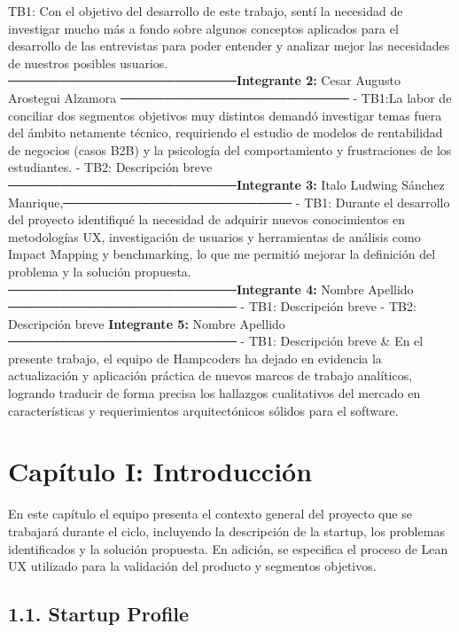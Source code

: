 {\begin{longtable}[]
TB1: Con el objetivo del desarrollo de este trabajo, sentí la necesidad
de investigar mucho más a fondo sobre algunos conceptos aplicados para
el desarrollo de las entrevistas para poder entender y analizar mejor
las necesidades de nuestros posibles usuarios.
──────────────────────────\textbf{Integrante 2:} Cesar Augusto Arostegui
Alzamora ────────────────────────── - TB1:La labor de conciliar dos
segmentos objetivos muy distintos demandó investigar temas fuera del
ámbito netamente técnico, requiriendo el estudio de modelos de
rentabilidad de negocios (casos B2B) y la psicología del comportamiento
y frustraciones de los estudiantes. - TB2: Descripción breve
──────────────────────────\textbf{Integrante 3:} Italo Ludwing Sánchez
Manrique,────────────────────────── - TB1: Durante el desarrollo del
proyecto identifiqué la necesidad de adquirir nuevos conocimientos en
metodologías UX, investigación de usuarios y herramientas de análisis
como Impact Mapping y benchmarking, lo que me permitió mejorar la
definición del problema y la solución propuesta.
──────────────────────────\textbf{Integrante 4:} Nombre Apellido
────────────────────────── - TB1: Descripción breve - TB2: Descripción
breve \textbf{Integrante 5:} Nombre Apellido ──────────────────────────
- TB1: Descripción breve & En el presente trabajo, el equipo de
Hampcoders ha dejado en evidencia la actualización y aplicación práctica
de nuevos marcos de trabajo analíticos, logrando traducir de forma
precisa los hallazgos cualitativos del mercado en características y
requerimientos arquitectónicos sólidos para el software. \\
\end{longtable}
}

\normalsize

\newpage

\section{Capítulo I:
Introducción}\label{report__10-cap1-introduccion.md__capuxedtulo-i-introducciuxf3n}

En este capítulo el equipo presenta el contexto general del proyecto que
se trabajará durante el ciclo, incluyendo la descripción de la startup,
los problemas identificados y la solución propuesta. En adición, se
especifica el proceso de Lean UX utilizado para la validación del
producto y segmentos objetivos.

\subsection{1.1. Startup
Profile}\label{report__10-cap1-introduccion.md__startup-profile}

